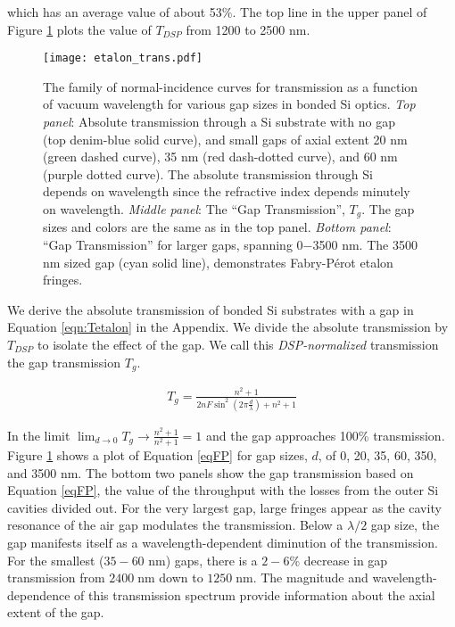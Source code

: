 \documentclass[osajnl,twocolumn,showpacs,superscriptaddress,11pt]{revtex4-1} %
\begin{document}
which has an average value of about 53\%.  The top line in the upper panel of Figure \ref{figAbsoluteTrans} plots the value of $T_{DSP}$ from 1200 to 2500 nm.

\begin{figure}[!htbp]
\texttt{[image: etalon\_trans.pdf]}
\caption{\label{figAbsoluteTrans}The family of normal-incidence curves for transmission as a function of vacuum wavelength for various gap sizes in bonded Si optics.  \emph{Top panel}: Absolute transmission through a Si substrate with no gap (top denim-blue solid curve), and small gaps of axial extent 20 nm (green dashed curve), 35 nm (red dash-dotted curve), and 60 nm (purple dotted curve).  The absolute transmission through Si depends on wavelength since the refractive index depends minutely on wavelength.  \emph{Middle panel}: The ``Gap Transmission'', $T_g$. The gap sizes and colors are the same as in the top panel.  \emph{Bottom panel}: ``Gap Transmission'' for larger gaps, spanning 0$-$3500 nm.  The 3500 nm sized gap (cyan solid line), demonstrates Fabry-P\'{e}rot etalon fringes.}
\end{figure}

We derive the absolute transmission of bonded Si substrates with a gap in Equation \ref{eqn:Tetalon} in the Appendix.  We divide the absolute transmission by $T_{DSP}$ to isolate the effect of the gap.  We call this \emph{DSP-normalized} transmission the gap transmission $T_{g}$.

\begin{eqnarray}
T_{g} = \frac{n^2+1}{2 n F \sin ^2(2\pi \frac{d}{\lambda})+n^2+1} \label{eqFP}
\end{eqnarray}

In the limit $\lim_{d \to 0} T_g \rightarrow \frac{n^2 + 1}{n^2 + 1} = 1 $ and the gap approaches 100\% transmission.  Figure \ref{figAbsoluteTrans} shows a plot of Equation \ref{eqFP} for gap sizes, $d$, of 0, 20, 35, 60, 350, and 3500 nm.  The bottom two panels show the gap transmission based on Equation \ref{eqFP}, the value of the throughput with the losses from the outer Si cavities divided out.  For the very largest gap, large fringes appear as the cavity resonance of the air gap modulates the transmission.  Below a $\lambda/2$ gap size, the gap manifests itself as a wavelength-dependent diminution of the transmission.  For the smallest ($35-60$ nm) gaps, there is a $2-6\%$ decrease in gap transmission from $2400\;$nm down to $1250\;$nm.  The magnitude and wavelength-dependence of this transmission spectrum provide information about the axial extent of the gap.
\end{document}
